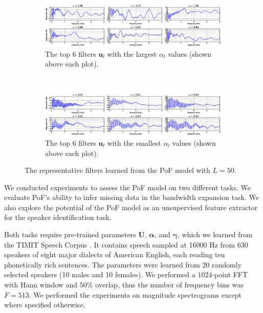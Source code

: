 \documentclass{article} %
\begin{document}
\begin{figure}
        \centering
        \begin{subfigure}[b]{1\textwidth}
                \includegraphics[width=\textwidth]{filters_L50}		
		\caption{The top 6 filters $\bm{u}_l$ with the largest $\alpha_l$ values (shown above each plot). }
		\label{fig:filters}
        \end{subfigure}%
       \\%
        \begin{subfigure}[b]{1\textwidth}
                \includegraphics[width=\textwidth]{sources_L50}
		\caption{The top 6 filters $\bm{u}_l$ with the smallest $\alpha_l$ values (shown above each plot). }
		\label{fig:sources}
        \end{subfigure}
        \caption{The representative filters learned from the PoF model with $L = 50$.}\label{fig:sf}
\end{figure}

We conducted experiments to assess the PoF model on two different tasks. We evaluate PoF's ability to infer missing data in the bandwidth expansion task. We also explore the potential of the PoF model as an unsupervised feature extractor for the speaker identification task. 

Both tasks require pre-trained parameters $\mathbf{U}$, $\bm{\alpha}$, and $\bm{\gamma}$, which we learned from the TIMIT Speech Corpus \cite{fisher1986darpa}. It contains speech sampled at 16000 Hz from 630 speakers of eight major dialects of American English, each reading ten phonetically rich sentences. The parameters were learned from 20 randomly selected speakers (10 males and 10 females). We performed a $1024$-point FFT with Hann window and $50\%$ overlap, thus the number of frequency bins was $F = 513$. We performed the experiments on magnitude spectrograms except where specified otherwise. 
\end{document}
